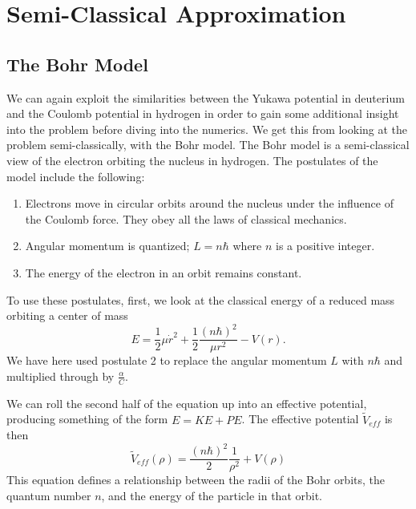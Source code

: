 \documentclass[12pt,twoside]{reedthesis}
\newcommand{\eqn}[1]{\begin{equation}#1\end{equation}}
\begin{document}
\clearpage %

\chapter{Semi-Classical Approximation}
\section{The Bohr Model}
We can again exploit the similarities between the Yukawa potential in deuterium and the Coulomb potential in hydrogen in order to gain some additional insight into the problem before diving into the numerics. We get this from looking at the problem semi-classically, with the Bohr model. The Bohr model is a semi-classical view of the electron orbiting the nucleus in hydrogen. The postulates of the model include the following:
\begin{enumerate}
\item Electrons move in circular orbits around the nucleus under the influence of the Coulomb force. They obey all the laws of classical mechanics.
\item Angular momentum is quantized; $L = n\hbar$ where $n$ is a positive integer.
\item The energy of the electron in an orbit remains constant.
\end{enumerate}

To use these postulates, first, we look at the classical energy of a reduced mass orbiting a center of mass
\eqn{
E = \frac{1}{2}\mu \dot{r}^2+\frac{1}{2}\frac{(n \hbar)^2}{\mu r^2}-V(r)\mbox{.}
\label{eq:classical-energy}
}
We have here used postulate 2 to replace the angular momentum $L$ with $n \hbar$ and multiplied through by $\frac{\alpha}{C}$. 

We can roll the second half of the equation up into an effective potential, producing something of the form $E = KE + PE$. The effective potential $\tilde{V}_{eff}$ is then
\eqn{
\tilde{V}_{eff}(\rho)=\frac{(n \hbar)^2}{2}\frac{1}{\rho^2}+V(\rho)
\label{eq:veff}
}
This equation defines a relationship between the radii of the Bohr orbits, the quantum number $n$, and the energy of the particle in that orbit. 
\end{document}
